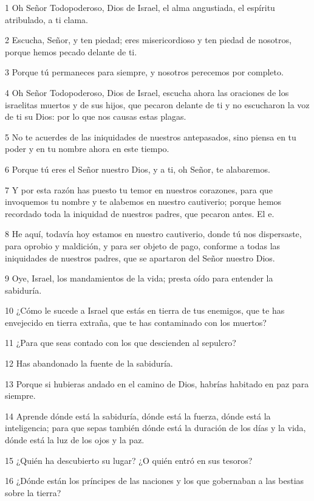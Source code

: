 \par 1 Oh Señor Todopoderoso, Dios de Israel, el alma angustiada, el espíritu atribulado, a ti clama.
\par 2 Escucha, Señor, y ten piedad; eres misericordioso y ten piedad de nosotros, porque hemos pecado delante de ti.
\par 3 Porque tú permaneces para siempre, y nosotros perecemos por completo.
\par 4 Oh Señor Todopoderoso, Dios de Israel, escucha ahora las oraciones de los israelitas muertos y de sus hijos, que pecaron delante de ti y no escucharon la voz de ti su Dios: por lo que nos causas estas plagas.
\par 5 No te acuerdes de las iniquidades de nuestros antepasados, sino piensa en tu poder y en tu nombre ahora en este tiempo.
\par 6 Porque tú eres el Señor nuestro Dios, y a ti, oh Señor, te alabaremos.
\par 7 Y por esta razón has puesto tu temor en nuestros corazones, para que invoquemos tu nombre y te alabemos en nuestro cautiverio; porque hemos recordado toda la iniquidad de nuestros padres, que pecaron antes. El e.
\par 8 He aquí, todavía hoy estamos en nuestro cautiverio, donde tú nos dispersaste, para oprobio y maldición, y para ser objeto de pago, conforme a todas las iniquidades de nuestros padres, que se apartaron del Señor nuestro Dios.
\par 9 Oye, Israel, los mandamientos de la vida; presta oído para entender la sabiduría.
\par 10 ¿Cómo le sucede a Israel que estás en tierra de tus enemigos, que te has envejecido en tierra extraña, que te has contaminado con los muertos?
\par 11 ¿Para que seas contado con los que descienden al sepulcro?
\par 12 Has abandonado la fuente de la sabiduría.
\par 13 Porque si hubieras andado en el camino de Dios, habrías habitado en paz para siempre.
\par 14 Aprende dónde está la sabiduría, dónde está la fuerza, dónde está la inteligencia; para que sepas también dónde está la duración de los días y la vida, dónde está la luz de los ojos y la paz.
\par 15 ¿Quién ha descubierto su lugar? ¿O quién entró en sus tesoros?
\par 16 ¿Dónde están los príncipes de las naciones y los que gobernaban a las bestias sobre la tierra?
